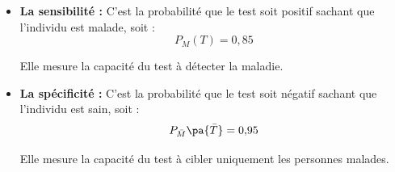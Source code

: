 \begin{methode}
	\begin{itemize}
		\item \textbf{La sensibilité :} C'est la probabilité que le test soit positif sachant que l'individu est malade, soit :
		      \[
			      P_M(T) = 0{,}85
		      \]

		      Elle mesure la capacité du test à détecter la maladie.
		\item \textbf{La spécificité :} C'est la probabilité que le test soit négatif sachant que l'individu est sain, soit :
		      \[
			      P_{\bar{M}}\pa{\bar{T}} = 0{,}95
		      \]

		      Elle mesure la capacité du test à cibler uniquement les personnes malades.
	\end{itemize}
\end{methode}
